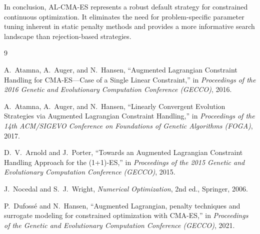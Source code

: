 \documentclass[11pt,a4paper]{article}
\numberwithin{equation}{section}
\numberwithin{figure}{section}
\numberwithin{table}{section}
\theoremstyle{definition}
\begin{document}
In conclusion, AL-CMA-ES represents a robust default strategy for constrained continuous optimization. It eliminates the need for problem-specific parameter tuning inherent in static penalty methods and provides a more informative search landscape than rejection-based strategies.

\clearpage
\begin{thebibliography}{9}

A.~Atamna, A.~Auger, and N.~Hansen,
\newblock ``Augmented Lagrangian Constraint Handling for CMA-ES---Case of a Single Linear Constraint,''
\newblock in \emph{Proceedings of the 2016 Genetic and Evolutionary Computation Conference (GECCO)}, 2016.

A.~Atamna, A.~Auger, and N.~Hansen,
\newblock ``Linearly Convergent Evolution Strategies via Augmented Lagrangian Constraint Handling,''
\newblock in \emph{Proceedings of the 14th ACM/SIGEVO Conference on Foundations of Genetic Algorithms (FOGA)}, 2017.

D.~V.~Arnold and J.~Porter,
\newblock ``Towards an Augmented Lagrangian Constraint Handling Approach for the (1+1)-ES,''
\newblock in \emph{Proceedings of the 2015 Genetic and Evolutionary Computation Conference (GECCO)}, 2015.

J.~Nocedal and S.~J.~Wright,
\newblock \emph{Numerical Optimization},
\newblock 2nd ed., Springer, 2006.

P.~Dufoss{\'e} and N.~Hansen,
\newblock ``Augmented Lagrangian, penalty techniques and surrogate modeling for constrained optimization with CMA-ES,''
\newblock in \emph{Proceedings of the Genetic and Evolutionary Computation Conference (GECCO)}, 2021.

\end{thebibliography}
\end{document}
